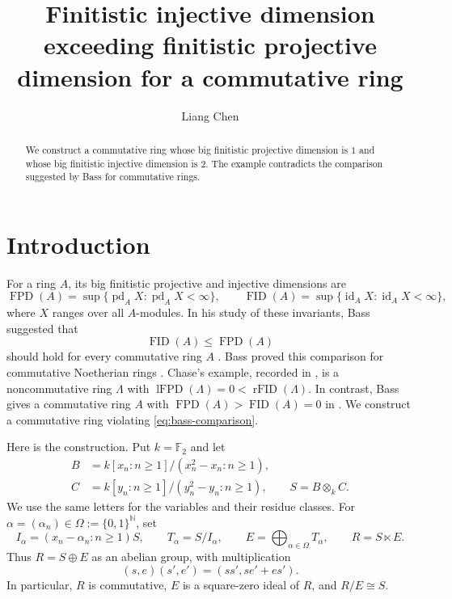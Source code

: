 \documentclass[11pt]{amsart}
\title[Finitistic dimensions of a commutative ring]{Finitistic injective dimension exceeding finitistic projective dimension for a commutative ring}
\author{Liang Chen}
\date{}
\theoremstyle{definition}
\DeclareMathOperator{\FPD}{FPD}
\DeclareMathOperator{\FID}{FID}
\DeclareMathOperator{\pd}{pd}
\DeclareMathOperator{\id}{id}
\newcommand{\FF}{\mathbb F_2}
\newcommand{\NN}{\mathbb N}
\numberwithin{equation}{section}
\begin{document}
\begin{abstract}
We construct a commutative ring whose big finitistic projective dimension
is $1$ and whose big finitistic injective dimension is $2$. 
The example contradicts the comparison suggested by Bass for commutative rings.
\end{abstract}

\maketitle

\section{Introduction}

For a ring $A$, its big finitistic projective and injective dimensions are
\[
 \FPD(A)=\sup\{\pd_A X:\pd_A X<\infty\},\qquad
 \FID(A)=\sup\{\id_A X:\id_A X<\infty\},
\]
where $X$ ranges over all $A$-modules. In his study of these invariants,
Bass suggested that
\begin{equation}\label{eq:bass-comparison}
 \FID(A)\leq\FPD(A)
\end{equation}
should hold for every commutative ring $A$ \cite[p.~487]{Bass1960}.
Bass proved this comparison for commutative Noetherian rings
\cite[Corollary~5.5]{Bass1962}. Chase's example, recorded in
\cite[Example~8.5, p.~487]{Bass1960}, is a noncommutative ring $\Lambda$
with $\operatorname{lFPD}(\Lambda)=0<\operatorname{rFID}(\Lambda)$.
In contrast, Bass gives a commutative ring $A$ with
$\FPD(A)>\FID(A)=0$ in \cite[Example~8.6, p.~488]{Bass1960}. We construct a commutative ring
violating \eqref{eq:bass-comparison}.

Here is the construction. Put $k=\FF$ and let
\begin{align*}
 B&=k[x_n:n\geq1]/(x_n^2-x_n:n\geq1),\\
 C&=k[y_n:n\geq1]/(y_n^2-y_n:n\geq1),\qquad S=B\otimes_k C.
\end{align*}
We use the same letters for the variables and their residue classes.
For $\alpha=(\alpha_n)\in\Omega:=\{0,1\}^{\NN}$, set
\begin{equation}\label{eq:construction}
 I_\alpha=(x_n-\alpha_n:n\geq1)S,\qquad
 T_\alpha=S/I_\alpha,\qquad
 E=\bigoplus_{\alpha\in\Omega}T_\alpha,\qquad R=S\ltimes E.
\end{equation}
Thus $R=S\oplus E$ as an abelian group, with multiplication
\begin{equation}\label{eq:ring-multiplication}
 (s,e)(s',e')=(ss',se'+es').
\end{equation}
In particular, $R$ is commutative, $E$ is a square-zero ideal of $R$,
and $R/E\cong S$.
\end{document}
